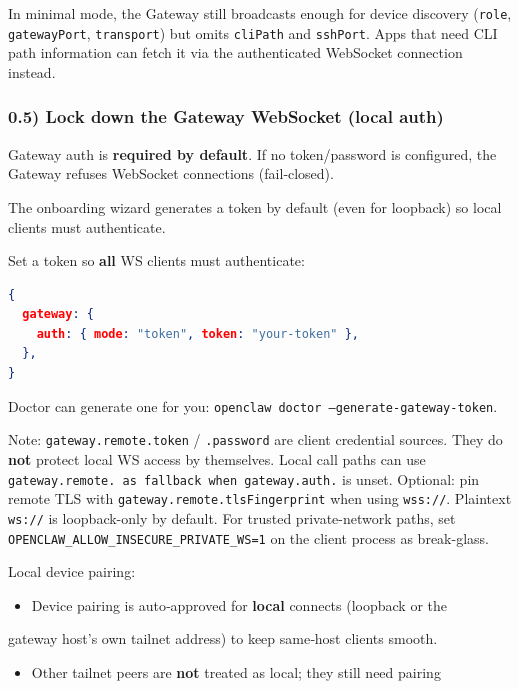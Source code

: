 In minimal mode, the Gateway still broadcasts enough for device discovery (\texttt{role}, \texttt{gatewayPort}, \texttt{transport}) but omits \texttt{cliPath} and \texttt{sshPort}. Apps that need CLI path information can fetch it via the authenticated WebSocket connection instead.

\subsubsection{0.5) Lock down the Gateway WebSocket (local auth)}


Gateway auth is \textbf{required by default}. If no token/password is configured,
the Gateway refuses WebSocket connections (fail‑closed).

The onboarding wizard generates a token by default (even for loopback) so
local clients must authenticate.

Set a token so \textbf{all} WS clients must authenticate:

\begin{lstlisting}[language=json]
{
  gateway: {
    auth: { mode: "token", token: "your-token" },
  },
}
\end{lstlisting}


Doctor can generate one for you: \texttt{openclaw doctor --generate-gateway-token}.

Note: \texttt{gateway.remote.token} / \texttt{.password} are client credential sources. They
do \textbf{not} protect local WS access by themselves.
Local call paths can use \texttt{gateway.remote.\textit{} as fallback when \texttt{gateway.auth.}}
is unset.
Optional: pin remote TLS with \texttt{gateway.remote.tlsFingerprint} when using \texttt{wss://}.
Plaintext \texttt{ws://} is loopback-only by default. For trusted private-network
paths, set \texttt{OPENCLAW\_ALLOW\_INSECURE\_PRIVATE\_WS=1} on the client process as break-glass.

Local device pairing:

\begin{itemize}
  \item Device pairing is auto‑approved for \textbf{local} connects (loopback or the
\end{itemize}

gateway host’s own tailnet address) to keep same‑host clients smooth.
\begin{itemize}
  \item Other tailnet peers are \textbf{not} treated as local; they still need pairing
\end{itemize}

